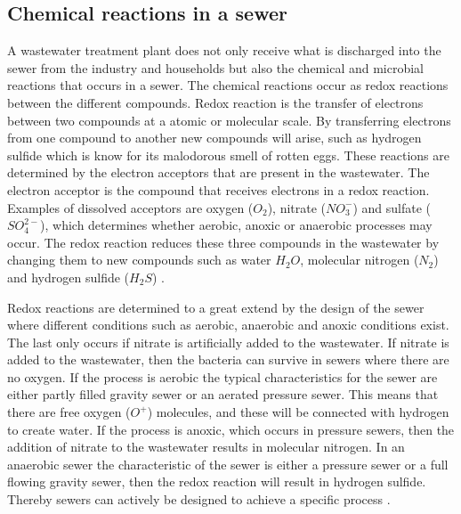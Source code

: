 \subsection{Chemical reactions in a sewer}\label{subse:chemical_reactions_in_a_sewer}
A wastewater treatment plant does not only receive what is discharged into the sewer from the industry and households but also the chemical and microbial reactions that occurs in a sewer. The chemical reactions occur as redox reactions between the different compounds. Redox reaction is the transfer of electrons between two compounds at a atomic or molecular scale. By transferring electrons from one compound to another new compounds will arise, such as hydrogen sulfide which is know for its malodorous smell of rotten eggs. These reactions are determined by the electron acceptors that are present in the wastewater. The electron acceptor is the compound that receives electrons in a redox reaction. Examples of dissolved acceptors are oxygen ($O_2$), nitrate ($NO^-_3$) and sulfate ($SO^{2-}_4$), which determines whether aerobic, anoxic or anaerobic processes may occur. The redox reaction reduces these three compounds in the wastewater by changing them to new compounds such as water $H_2O$, molecular nitrogen ($N_2$) and hydrogen sulfide ($H_2S$) \cite{Sewer_processes}. 

Redox reactions are determined to a great extend by the design of the sewer where different conditions such as aerobic, anaerobic and anoxic conditions exist. The last only occurs if nitrate is artificially added to the wastewater. If nitrate is added to the wastewater, then the bacteria can survive in sewers where there are no oxygen. If the process is aerobic the typical characteristics for the sewer are either partly filled gravity sewer or an aerated pressure sewer. This means that there are free oxygen ($O^+$) molecules, and these will be connected with hydrogen to create water. If the process is anoxic, which occurs in pressure sewers, then the addition of nitrate to the wastewater results in molecular nitrogen. In an anaerobic sewer the characteristic of the sewer is either a pressure sewer or a full flowing gravity sewer, then the redox reaction will result in hydrogen sulfide. Thereby sewers can actively be designed to achieve a specific process \cite{Sewer_processes}. 


